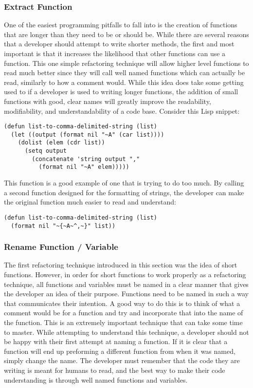 \documentclass{article}
\begin{document}
\subsubsection{Extract Function}

One of the easiest programming pitfalls to fall into is the creation of functions that are longer than they need to be or should be. While there are several reasons that a developer should attempt to write shorter methods, the first and most important is that it increases the likelihood that other functions can use a function. This one simple refactoring technique will allow higher level functions to read much better since they will call well named functions which can actually be read, similarly to how a comment would. While this idea does take some getting used to if a developer is used to writing longer functions, the addition of small functions with good, clear names will greatly improve the readability, modifiability, and understandability of a code base. Consider this Lisp snippet:

\begin{verbatim}
(defun list-to-comma-delimited-string (list)
  (let ((output (format nil "~A" (car list))))
    (dolist (elem (cdr list))
      (setq output 
        (concatenate 'string output "," 
          (format nil "~A" elem)))))
\end{verbatim}

This function is a good example of one that is trying to do too much. By calling a second function designed for the formatting of strings, the developer can make the original function much easier to read and understand:

\begin{verbatim}
(defun list-to-comma-delimited-string (list)
  (format nil "~{~A~^,~}" list))
\end{verbatim}

\subsubsection{Rename Function / Variable}

The first refactoring technique introduced in this section was the idea of short functions. However, in order for short functions to work properly as a refactoring technique, all functions and variables must be named in a clear manner that gives the developer an idea of their purpose. Functions need to be named in such a way that communicates their intention. A good way to do this is to think of what a comment would be for a function and try and incorporate that into the name of the function. This is an extremely important technique that can take some time to master. While attempting to understand this technique, a developer should not be happy with their first attempt at naming a function. If it is clear that a function will end up preforming a different function from when it was named, simply change the name. The developer must remember that the code they are writing is meant for humans to read, and the best way to make their code understanding is through well named functions and variables\cite{2}. 
\end{document}
